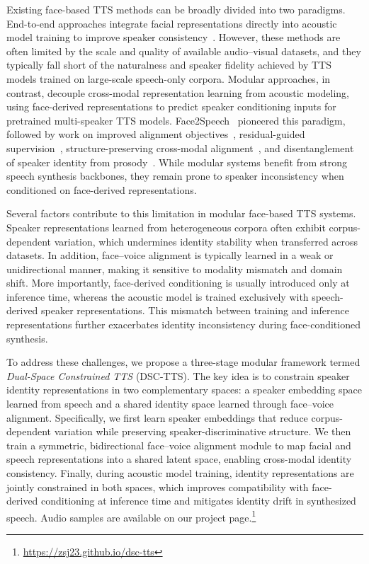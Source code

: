 \documentclass[cameraready]{Interspeech}
\begin{document}
Existing face-based TTS methods can be broadly divided into two paradigms. End-to-end approaches integrate facial representations directly into acoustic model training to improve speaker consistency~\cite{10094745,lee24_interspeech,jeon-etal-2025-progressive}. However, these methods are often limited by the scale and quality of available audio--visual datasets, and they typically fall short of the naturalness and speaker fidelity achieved by TTS models trained on large-scale speech-only corpora. Modular approaches, in contrast, decouple cross-modal representation learning from acoustic modeling, using face-derived representations to predict speaker conditioning inputs for pretrained multi-speaker TTS models. Face2Speech~\cite{goto20_interspeech} pioneered this paradigm, followed by work on improved alignment objectives~\cite{9687866}, residual-guided supervision~\cite{9746808}, structure-preserving cross-modal alignment~\cite{10448433}, and disentanglement of speaker identity from prosody~\cite{10889667}. While modular systems benefit from strong speech synthesis backbones, they remain prone to speaker inconsistency when conditioned on face-derived representations.

Several factors contribute to this limitation in modular face-based TTS systems. Speaker representations learned from heterogeneous corpora often exhibit corpus-dependent variation, which undermines identity stability when transferred across datasets. In addition, face--voice alignment is typically learned in a weak or unidirectional manner, making it sensitive to modality mismatch and domain shift. More importantly, face-derived conditioning is usually introduced only at inference time, whereas the acoustic model is trained exclusively with speech-derived speaker representations. This mismatch between training and inference representations further exacerbates identity inconsistency during face-conditioned synthesis.

To address these challenges, we propose a three-stage modular framework termed \emph{Dual-Space Constrained TTS} (DSC-TTS). The key idea is to constrain speaker identity representations in two complementary spaces: a speaker embedding space learned from speech and a shared identity space learned through face--voice alignment. Specifically, we first learn speaker embeddings that reduce corpus-dependent variation while preserving speaker-discriminative structure. We then train a symmetric, bidirectional face--voice alignment module to map facial and speech representations into a shared latent space, enabling cross-modal identity consistency. Finally, during acoustic model training, identity representations are jointly constrained in both spaces, which improves compatibility with face-derived conditioning at inference time and mitigates identity drift in synthesized speech. Audio samples are available on our project page.\footnote{\url{https://zsj23.github.io/dsc-tts}}
\end{document}
